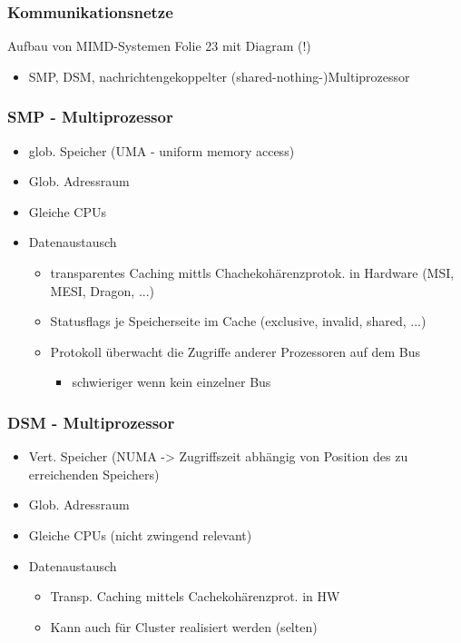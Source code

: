 \subsubsection{Kommunikationsnetze}
Aufbau von MIMD-Systemen
Folie 23 mit Diagram (!)

\begin{itemize}
	\item SMP, DSM, nachrichtengekoppelter (shared-nothing-)Multiprozessor
\end{itemize}


\subsubsection{SMP - Multiprozessor}

\begin{itemize}
	\item glob. Speicher (UMA - uniform memory access)
	\item Glob. Adressraum
	\item Gleiche CPUs
	\item Datenaustausch
		\begin{itemize}
			\item transparentes Caching mittls Chachekohärenzprotok. in Hardware (MSI, MESI, Dragon, ...)
			\item Statusflags je Speicherseite im Cache (exclusive, invalid, shared, ...)
			\item Protokoll überwacht die Zugriffe anderer Prozessoren auf dem Bus
				\begin{itemize}
					\item schwieriger wenn kein einzelner Bus
				\end{itemize}
		\end{itemize}
\end{itemize}


\subsubsection{DSM - Multiprozessor}

\begin{itemize}
	\item Vert. Speicher (NUMA -> Zugriffszeit abhängig von Position des zu erreichenden Speichers)
	\item Glob. Adressraum
	\item Gleiche CPUs (nicht zwingend relevant)
	\item Datenaustausch
		\begin{itemize}
			\item Transp. Caching mittels Cachekohärenzprot. in HW
			\item Kann auch für Cluster realisiert werden (selten)
		\end{itemize}
\end{itemize}


